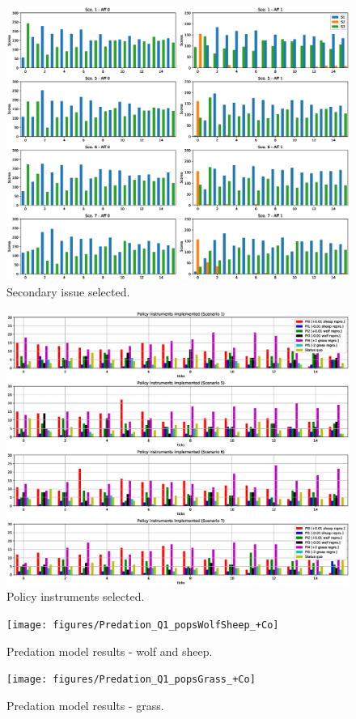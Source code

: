 \documentclass[12pt]{article}
\begin{document}
\begin{figure}
\centering
\includegraphics[width = 0.95\linewidth, angle = 0]{figures/PE_PL_SSelected_+Co}
\caption{Secondary issue selected.}
\label{fig:PE_PL_SSelected}
\end{figure}

\begin{figure}
\centering
\includegraphics[width = 0.95\linewidth, angle = 0]{figures/PE_PI_selection_+Co}
\caption{Policy instruments selected.}
\label{fig:PE_PI_selection}
\end{figure}

\begin{figure}
\centering
\texttt{[image: figures/Predation\_Q1\_popsWolfSheep\_+Co]}
\caption{Predation model results - wolf and sheep.}
\label{fig:Predation_Q1_popsWolfSheep}
\end{figure}

\begin{figure}
\centering
\texttt{[image: figures/Predation\_Q1\_popsGrass\_+Co]}
\caption{Predation model results - grass.}
\label{fig:Predation_Q1_popsGrass}
\end{figure}



 

\end{document}
